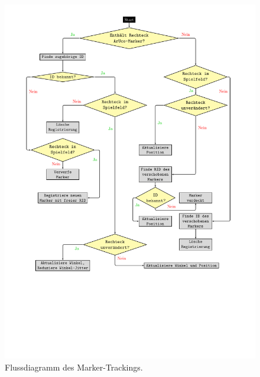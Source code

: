 \begin{figure}[htbp]
	\centering
	\includegraphics[scale=.8, trim=3cm 6.5cm 3.5cm 9 cm]{kapitel/system/MP_Marker_Erkennung.pdf}
	\caption[Flussdiagramm des Marker-Trackings]{Flussdiagramm des Marker-Trackings.}
	\label{fig:TrackingDiagram}
\end{figure}

